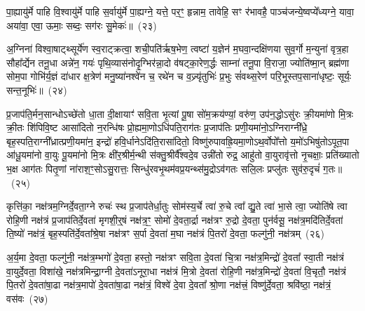 पा॒ह्यायु॑र्मे पाहि वि॒श्वायु॑र्मे पाहि स॒र्वायु॑र्मे पा॒ह्यग्ने॒ यत्ते॒ पर॒ꣳ॒ हृन्नाम॒ तावेहि॒ सꣳ र॑भावहै॒ पाञ्च॑जन्ये॒ष्वप्ये᳚ध्यग्ने॒ यावा॒ अया॑वा॒ एवा॒ ऊमाः॒ सब्दः॒ सग॑रः सु॒मेकः॑॥~(२३)

{\anuvakamend[{व्या॒नं मे॒ द्वात्रिꣳ॑शच्च}]}%

अ॒ग्निना॑ विश्वा॒षाट्थ्सूर्ये॑ण स्व॒राट्क्रत्वा॒ शची॒पति॑र्\mbox{}ऋष॒भेण॒ त्वष्टा॑ य॒ज्ञेन॑ म॒घवा॒न्दक्षि॑णया सुव॒र्गो म॒न्युना॑ वृत्र॒हा सौहा᳚र्द्येन तनू॒धा अन्ने॑न॒ गयः॑ पृथि॒व्यास॑नोदृ॒ग्भिर॑न्ना॒दो व॑षट्का॒रेण॒र्द्धः साम्ना॑ तनू॒पा वि॒राजा॒ ज्योति॑ष्मा॒न् ब्रह्म॑णा सोम॒पा गोभि॑र्य॒ज्ञं दा॑धार क्ष॒त्रेण॑ मनु॒ष्या॑नश्वे॑न च॒ रथे॑न च व॒ज्र्यृ॑तुभिः॑ प्र॒भुः सं॑वथ्स॒रेण॑ परि॒भूस्तप॒साना॑धृष्टः॒ सूर्यः॒ सन्त॒नूभिः॑॥~(२४)

{\anuvakamend[{अ॒ग्निनैका॒न्नप॑ञ्चा॒शत्}]}%

प्र॒जा\-प॑ति॒र्मन॒सान्धो\-ऽच्छे॑तो धा॒ता दी॒क्षायाꣳ॑ सवि॒ता भृ॒त्यां पू॒षा सो॑म॒क्रय॑ण्यां॒ वरु॑ण॒ उप॑न॒द्धो\-ऽसु॑रः क्री॒यमा॑णो मि॒त्रः क्री॒तः शि॑पिवि॒ष्ट आसा॑दितो न॒रन्धि॑षः प्रो॒ह्यमा॒णो\-ऽधि॑पति॒राग॑तः प्र॒जा\-प॑तिः प्रणी॒यमा॑नो॒\-ऽग्निराग्नी᳚ध्रे॒ बृह॒स्पति॒राग्नी᳚ध्रात्प्रणी॒यमा॑न॒ इन्द्रो॑ हवि॒र्धाने\-ऽदि॑ति॒रासा॑दितो॒ विष्णु॑रुपावह्रि॒यमा॒णो\-ऽथ॒र्वोपो᳚त्तो य॒मो॑\-ऽभिषु॑तो\-ऽपूत॒पा आ॑धू॒यमा॑नो वा॒युः पू॒यमा॑नो मि॒त्रः क्षी॑र॒श्रीर्म॒न्थी स॑क्तु॒श्रीर्वै᳚श्वदे॒व उन्नी॑तो रुद्र॒ आहु॑तो वा॒युरावृ॑त्तो नृ॒चक्षाः॒ प्रति॑ख्यातो भ॒क्ष आग॑तः पितृ॒णां ना॑राश॒ꣳ॒सो\-ऽसु॒रात्तः॒ सिन्धु॑रवभृ॒थम॑वप्र॒यन्थ्स॑मु॒द्रो\-ऽव॑गतः सलि॒लः प्रप्लु॑तः सुव॑रु॒दृचं॑ ग॒तः॥~(२५)

{\anuvakamend[{रु॒द्र एक॑विꣳशतिश्च}]}%

कृत्ति॑का॒ नक्ष॑त्रम॒ग्निर्दे॒वता॒ग्ने रुचः॑ स्थ प्र॒जा\-प॑तेर्धा॒तुः सोम॑स्य॒र्चे त्वा॑ रु॒चे त्वा᳚ द्यु॒ते त्वा॑ भा॒से त्वा॒ ज्योति॑षे त्वा रोहि॒णी नक्ष॑त्रं प्र॒जा\-प॑तिर्दे॒वता॑ मृगशी॒र्॒\mbox{}षं नक्ष॑त्र॒ꣳ॒ सोमो॑ दे॒वता॒र्द्रा नक्ष॑त्रꣳ रु॒द्रो दे॒वता॒ पुन॑र्वसू॒ नक्ष॑त्र॒मदि॑ति\-र्दे॒वता॑ ति॒ष्यो॑ नक्ष॑त्रं॒ बृह॒स्पति॑र्दे॒वता᳚श्रे॒षा नक्ष॑त्रꣳ स॒र्पा दे॒वता॑ म॒घा नक्ष॑त्रं पि॒तरो॑ दे॒वता॒ फल्गु॑नी॒ नक्ष॑त्रम्~(२६)

अ॒र्य॒मा दे॒वता॒ फल्गु॑नी॒ नक्ष॑त्र॒म्भगो॑ दे॒वता॒ हस्तो॒ नक्ष॑त्रꣳ सवि॒ता दे॒वता॑ चि॒त्रा नक्ष॑त्र॒मिन्द्रो॑ दे॒वता᳚ स्वा॒ती नक्ष॑त्रं वा॒युर्दे॒वता॒ विशा॑खे॒ नक्ष॑त्रमिन्द्रा॒ग्नी दे॒वता॑\-ऽनूरा॒धा नक्ष॑त्रं मि॒त्रो दे॒वता॑ रोहि॒णी नक्ष॑त्र॒मिन्द्रो॑ दे॒वता॑ वि॒चृतौ॒ नक्ष॑त्रं पि॒तरो॑ दे॒वता॑षा॒ढा नक्ष॑त्र॒मापो॑ दे॒वता॑षा॒ढा नक्ष॑त्रं॒ विश्वे॑ दे॒वा दे॒वता᳚ श्रो॒णा नक्ष॑त्त्रं॒ विष्णु॑र्दे॒वता॒ श्रवि॑ष्ठा॒ नक्ष॑त्रं॒ वस॑वः~(२७)

